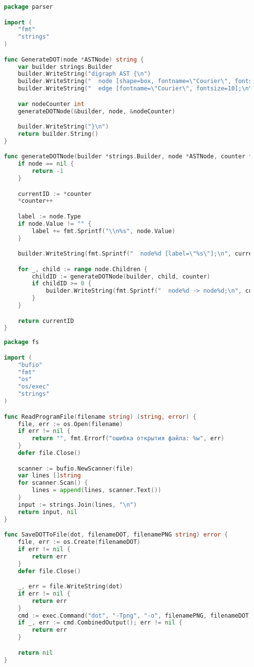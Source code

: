 \begin{lstlisting}[language=Go, caption={Код модуля \textit{parser}}]
package parser

import (
	"fmt"
	"strings"
)

func GenerateDOT(node *ASTNode) string {
	var builder strings.Builder
	builder.WriteString("digraph AST {\n")
	builder.WriteString("  node [shape=box, fontname=\"Courier\", fontsize=10];\n")
	builder.WriteString("  edge [fontname=\"Courier\", fontsize=10];\n\n")

	var nodeCounter int
	generateDOTNode(&builder, node, &nodeCounter)

	builder.WriteString("}\n")
	return builder.String()
}

func generateDOTNode(builder *strings.Builder, node *ASTNode, counter *int) int {
	if node == nil {
		return -1
	}

	currentID := *counter
	*counter++

	label := node.Type
	if node.Value != "" {
		label += fmt.Sprintf("\\n%s", node.Value)
	}

	builder.WriteString(fmt.Sprintf("  node%d [label=\"%s\"];\n", currentID, label))

	for _, child := range node.Children {
		childID := generateDOTNode(builder, child, counter)
		if childID >= 0 {
			builder.WriteString(fmt.Sprintf("  node%d -> node%d;\n", currentID, childID))
		}
	}

	return currentID
}
\end{lstlisting}

\begin{lstlisting}[language=Go, caption={Код модуля \textit{fs}}, label=lst2]
package fs

import (
	"bufio"
	"fmt"
	"os"
	"os/exec"
	"strings"
)

func ReadProgramFile(filename string) (string, error) {
	file, err := os.Open(filename)
	if err != nil {
		return "", fmt.Errorf("ошибка открытия файла: %w", err)
	}
	defer file.Close()

	scanner := bufio.NewScanner(file)
	var lines []string
	for scanner.Scan() {
		lines = append(lines, scanner.Text())
	}
	input := strings.Join(lines, "\n")
	return input, nil
}

func SaveDOTToFile(dot, filenameDOT, filenamePNG string) error {
	file, err := os.Create(filenameDOT)
	if err != nil {
		return err
	}
	defer file.Close()

	_, err = file.WriteString(dot)
	if err != nil {
		return err
	}
	cmd := exec.Command("dot", "-Tpng", "-o", filenamePNG, filenameDOT)
	if _, err := cmd.CombinedOutput(); err != nil {
		return err
	}

	return nil
}

\end{lstlisting}


\newpage